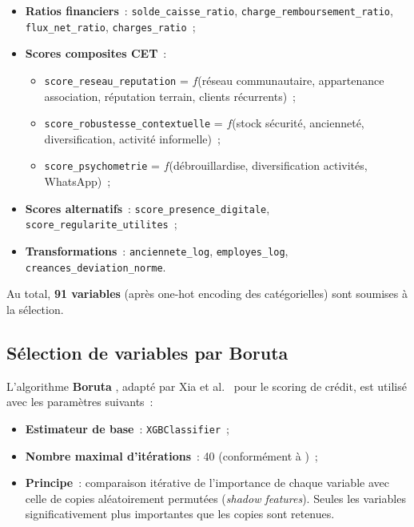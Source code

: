\documentclass[12pt, a4paper, twocolumn]{article}
\begin{document}
\begin{itemize}[leftmargin=*]
  \item \textbf{Ratios financiers}~: \texttt{solde\_caisse\_ratio}, \texttt{charge\_remboursement\_ratio}, \texttt{flux\_net\_ratio}, \texttt{charges\_ratio}~;
  \item \textbf{Scores composites CET}~:
  \begin{itemize}
    \item \texttt{score\_reseau\_reputation} = $f$(réseau communautaire, appartenance association, réputation terrain, clients récurrents)~;
    \item \texttt{score\_robustesse\_contextuelle} = $f$(stock sécurité, ancienneté, diversification, activité informelle)~;
    \item \texttt{score\_psychometrie} = $f$(débrouillardise, diversification activités, WhatsApp)~;
  \end{itemize}
  \item \textbf{Scores alternatifs}~: \texttt{score\_presence\_digitale}, \texttt{score\_regularite\_utilites}~;
  \item \textbf{Transformations}~: \texttt{anciennete\_log}, \texttt{employes\_log}, \texttt{creances\_deviation\_norme}.
\end{itemize}

Au total, \textbf{91 variables} (après one-hot encoding des catégorielles) sont soumises à la sélection.

\subsection{Sélection de variables par Boruta}
\label{subsec:boruta}

L'algorithme \textbf{Boruta} \cite{kursa2010}, adapté par Xia et al.~\cite{xia2024} pour le scoring de crédit, est utilisé avec les paramètres suivants~:

\begin{itemize}[leftmargin=*]
  \item \textbf{Estimateur de base}~: \texttt{XGBClassifier}~;
  \item \textbf{Nombre maximal d'itérations}~: 40 (conformément à \cite{xia2024})~;
  \item \textbf{Principe}~: comparaison itérative de l'importance de chaque variable avec celle de copies aléatoirement permutées (\textit{shadow features}). Seules les variables significativement plus importantes que les copies sont retenues.
\end{itemize}
\end{document}
